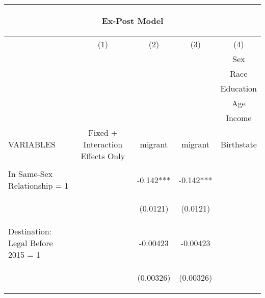 \documentclass[]{article}
\begin{document}
\begin{center}
\begin{tabular}{lcccc}
\multicolumn{5}{c}{\begin{large}Ex-Post Model\end{large}} \\ \hline
 & (1) & (2) & (3) & (4) \\
 &  &  &  & Sex \\
 &  &  &  & Race \\
 &  &  &  & Education \\
 &  &  &  & Age \\
 &  &  &  & Income \\
VARIABLES & Fixed + Interaction Effects Only & migrant & migrant & Birthstate \\ \hline
\vspace{4pt} & \begin{footnotesize}\end{footnotesize} & \begin{footnotesize}\end{footnotesize} & \begin{footnotesize}\end{footnotesize} & \begin{footnotesize}\end{footnotesize} \\
In Same-Sex Relationship = 1 &  & -0.142*** & -0.142*** &  \\
\vspace{4pt} & \begin{footnotesize}\end{footnotesize} & \begin{footnotesize}(0.0121)\end{footnotesize} & \begin{footnotesize}(0.0121)\end{footnotesize} & \begin{footnotesize}\end{footnotesize} \\
Destination: Legal Before 2015 = 1 &  & -0.00423 & -0.00423 &  \\
\vspace{4pt} & \begin{footnotesize}\end{footnotesize} & \begin{footnotesize}(0.00326)\end{footnotesize} & \begin{footnotesize}(0.00326)\end{footnotesize} & \begin{footnotesize}\end{footnotesize} \\

\end{tabular}
\end{center}
\end{document}
